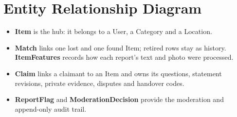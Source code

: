 \documentclass[12pt,a4paper,oneside]{report}
\begin{document}
\section{Entity Relationship Diagram}
\begin{itemize}
  \item \textbf{Item} is the hub: it belongs to a User, a Category and a Location.
  \item \textbf{Match} links one lost and one found Item; retired rows stay as history. \textbf{ItemFeatures} records how each report's text and photo were processed.
  \item \textbf{Claim} links a claimant to an Item and owns its questions, statement revisions, private evidence, disputes and handover codes.
  \item \textbf{ReportFlag} and \textbf{ModerationDecision} provide the moderation and append-only audit trail.
\end{itemize}
\end{document}
